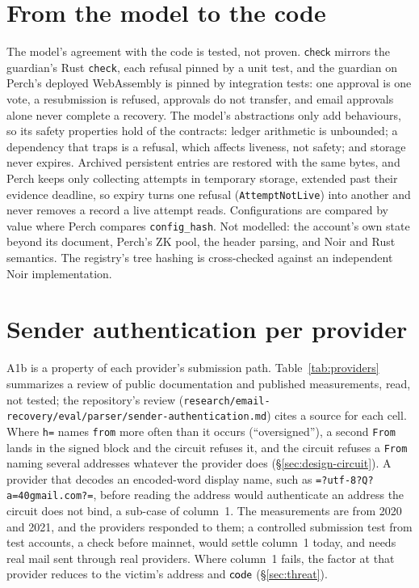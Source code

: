 \section{From the model to the code}\label{sec:gap}
The model's agreement with the code is tested, not proven. $\mathsf{check}$
mirrors the guardian's Rust \texttt{check}, each refusal pinned by a unit
test, and the guardian on Perch's deployed WebAssembly is pinned by
integration tests: one approval is one vote, a resubmission is refused,
approvals do not transfer, and email approvals alone never complete a
recovery. The model's abstractions only add
behaviours, so its safety properties hold of the contracts: ledger arithmetic
is unbounded; a dependency that traps is a refusal, which affects liveness,
not safety; and storage never expires. Archived persistent entries are
restored with the same bytes, and Perch keeps only collecting attempts in
temporary storage, extended past their evidence deadline, so expiry turns
one refusal (\texttt{AttemptNotLive}) into another and never removes a record
a live attempt reads. Configurations are compared by value where Perch
compares \texttt{config\_hash}. Not modelled: the account's own state beyond
its document, Perch's ZK pool, the header parsing, and Noir and Rust
semantics. The registry's tree hashing is cross-checked against an
independent Noir implementation.

\section{Sender authentication per provider}\label{app:providers}

A1b is a property of each provider's submission path. Table~\ref{tab:providers}
summarizes a review of public documentation and published measurements, read,
not tested; the repository's review
(\nolinkurl{research/email-recovery/eval/parser/sender-authentication.md})
cites a source for each cell. Where
\texttt{h=} names \texttt{from} more often than it occurs (``oversigned''), a
second \texttt{From} lands in the signed block and the circuit refuses it, and
the circuit refuses a \texttt{From} naming several addresses whatever the
provider does (\S\ref{sec:design-circuit}). A provider that decodes an
encoded-word display name, such as \texttt{=?utf-8?Q?a=40gmail.com?=}, before
reading the address would authenticate an address the circuit does not bind,
a sub-case of column~1. The measurements are from 2020 and 2021, and the
providers responded to them; a controlled submission test from test accounts,
a check before mainnet, would settle column~1 today, and needs real mail sent
through real providers. Where column~1 fails, the factor at that provider
reduces to the victim's address and $\mathsf{code}$ (\S\ref{sec:threat}).

